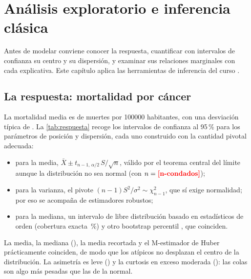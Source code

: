 \chapter{Análisis exploratorio e inferencia clásica}\label{cap:exploracion}

Antes de modelar conviene conocer la respuesta, cuantificar con intervalos de confianza su
centro y su dispersión, y examinar sus relaciones marginales con cada explicativa. Este capítulo
aplica las herramientas de inferencia del curso \parencite[caps.~6--10]{wasserman2004}.

\section{La respuesta: mortalidad por cáncer}

La mortalidad media es de  muertes por \num{100000} habitantes, con una desviación
típica de . La \cref{tab:respuesta} recoge los intervalos de confianza al 95\,\% para los
parámetros de posición y dispersión, cada uno construido con la cantidad pivotal adecuada:

\begin{itemize}
  \item para la media, $\bar X \pm t_{n-1,\,\alpha/2}\,S/\sqrt n$, válido por el teorema central
  del límite aunque la distribución no sea normal (con $n=\res{n-condados}$);
  \item para la varianza, el pivote $(n-1)S^2/\sigma^2\sim\chi^2_{n-1}$, que sí exige normalidad;
  por eso se acompaña de estimadores robustos;
  \item para la mediana, un intervalo de libre distribución basado en estadísticos de orden
  (cobertura exacta \,\%) y otro bootstrap percentil
  \parencite{efron1993}, que coinciden.
\end{itemize}



La media, la mediana (), la media recortada y el M-estimador de Huber
\parencite{huber1964} prácticamente coinciden, de modo que los atípicos no desplazan el centro de
la distribución. La asimetría es leve () y la curtosis en exceso moderada
(): las colas son algo más pesadas que las de la normal.


